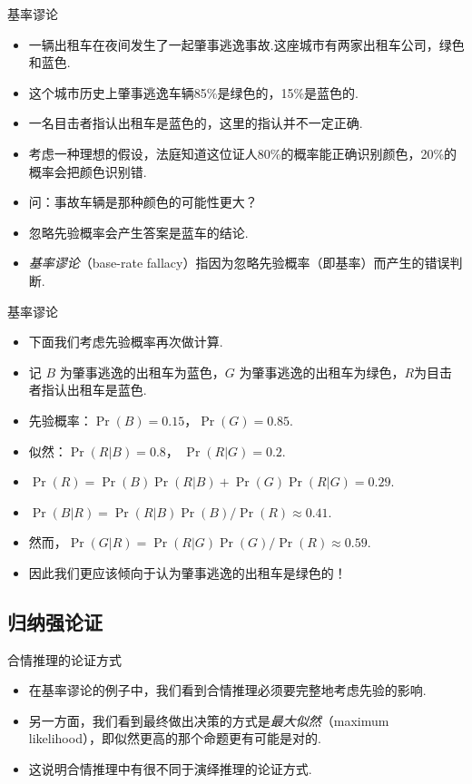 \begin{frame}{基率谬论}
    \begin{itemize}
        \item 一辆出租车在夜间发生了一起肇事逃逸事故.这座城市有两家出租车公司，绿色和蓝色.
        \item 这个城市历史上肇事逃逸车辆85\%是绿色的，15\%是蓝色的.
        \item 一名目击者指认出租车是蓝色的，这里的指认并不一定正确.
        \item 考虑一种理想的假设，法庭知道这位证人80\%的概率能正确识别颜色，20\%的概率会把颜色识别错.
        \item 问：事故车辆是那种颜色的可能性更大？
        \item 忽略先验概率会产生答案是蓝车的结论.
        \item \emph{基率谬论}（base-rate fallacy）指因为忽略先验概率（即基率）而产生的错误判断.
    \end{itemize}
    
\end{frame}

\begin{frame}{基率谬论}
    \begin{itemize}
        \item 下面我们考虑先验概率再次做计算.
        \item 记 $B$ 为肇事逃逸的出租车为蓝色，$G$ 为肇事逃逸的出租车为绿色，$R$为目击者指认出租车是蓝色.
        \item 先验概率：$\Pr(B) = 0.15$，$\Pr(G) = 0.85$.
        \item 似然：$\Pr(R|B) = 0.8$， $\Pr(R|G) = 0.2$.
        \item $\Pr(R) = \Pr(B)\Pr(R|B) + \Pr(G)\Pr(R|G)  =0.29$.
        \item $\Pr(B|R) = \Pr(R|B){\Pr(B)}/{\Pr(R)}\approx 0.41$.
        \item 然而，$\Pr(G|R) = \Pr(R|G){\Pr(G)}/{\Pr(R)}\approx 0.59$.
        \item 因此我们更应该倾向于认为肇事逃逸的出租车是绿色的！
    \end{itemize}
\end{frame}


\subsection{归纳强论证}
\begin{frame}{合情推理的论证方式}
\begin{itemize}
    \item 在基率谬论的例子中，我们看到合情推理必须要完整地考虑先验的影响.
    \item 另一方面，我们看到最终做出决策的方式是\emph{最大似然}（maximum likelihood），即似然更高的那个命题更有可能是对的.
    \item 这说明合情推理中有很不同于演绎推理的论证方式.
\end{itemize}
\end{frame}


